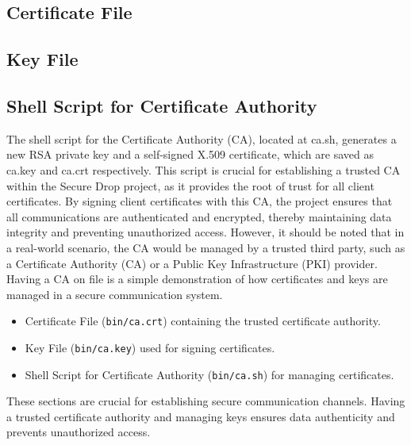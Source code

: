 \documentclass[12pt]{article}
\begin{document}
\subsection{Certificate File}


\subsection{Key File}


\subsection{Shell Script for Certificate Authority}
The shell script for the Certificate Authority (CA), located at ca.sh, generates a new RSA private key and a self-signed X.509 certificate, which are saved as ca.key and ca.crt respectively.
This script is crucial for establishing a trusted CA within the Secure Drop project, as it provides the root of trust for all client certificates.
By signing client certificates with this CA, the project ensures that all communications are authenticated and encrypted, thereby maintaining data integrity and preventing unauthorized access.
However, it should be noted that in a real-world scenario, the CA would be managed by a trusted third party, such as a Certificate Authority (CA) or a Public Key Infrastructure (PKI) provider.
Having a CA on file is a simple demonstration of how certificates and keys are managed in a secure communication system.



\begin{itemize}
    \item Certificate File (\texttt{bin/ca.crt}) containing the trusted certificate authority.
    \item Key File (\texttt{bin/ca.key}) used for signing certificates.
    \item Shell Script for Certificate Authority (\texttt{bin/ca.sh}) for managing certificates.
\end{itemize}

These sections are crucial for establishing secure communication channels. Having a trusted certificate authority and managing keys ensures data authenticity and prevents unauthorized access.

\newpage
\end{document}
